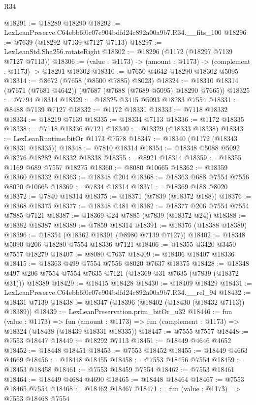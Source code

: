 \begin{lexlean}{R34}
\begin{coremodule}
@18291 := @18289 @18290
@18292 := LexLeanPreserve.C64ebb6f0c07e904bdfd24c892a00a9b7.R34.__fits_100
@18296 := @7639 (@18292 @7139 @7127 @7113)
@18297 := LexLeanStd.Sha256.rotateRight
@18302 := @18296 (@1172 (@18297 @7139 @7127 @7113))
@18306 := (value : @1173) -> (amount : @1173) -> (complement : @1173) -> @18291 @18302
@18310 := @7650 @4642 @18290 @18302 @5095
@18314 := @8672 (@7658 (@8500 @7885) @8023)
@18324 := @18310 @18314 (@7671 (@7681 @4642)) (@7687 (@7688 (@7689 @5095) @18290 @7665))
@18325 := @7794 @18314
@18329 := @18325 @3415 @5093 @18283 @7554
@18331 := @8488 @7139 @7127
@18332 := @1172 @18331
@18333 := @7118 @18332
@18334 := @18219 @7139
@18335 := @18334 @7113
@18336 := @1172 @18335
@18338 := @7118 @18336 @7121
@18340 := @18329 (@18333 @18338)
@18343 := LexLeanRuntime.bitOr @1173 @7578
@18347 := @18340 (@1172 (@18343 @18331 @18335))
@18348 := @7810 @18314
@18354 := @18348 @5088 @5092 @18276 @18282 @18332 @18338
@18355 := @8921 @18314
@18359 := @18355 @1169 @689 @7557 @18275
@18360 := @8080 @10665
@18362 := @18359 @18360 @18332
@18363 := @18348 @204
@18368 := @18363 @688 @7554 @7556 @8020 @10665
@18369 := @7834 @18314
@18371 := @18369 @188 @8020
@18372 := @7840 @18314
@18375 := @18371 (@7839 (@18372 @188))
@18376 := @18368 @18375
@18377 := @18348 @481
@18382 := @18377 @206 @7554 @7554 @7885 @7121
@18387 := @18369 @24 @7885 (@7839 (@18372 @24))
@18388 := @18382 @18387
@18389 := @7859 @18314
@18391 := @18376 (@18388 @18389)
@18396 := @18354 (@18362 @18391 (@8980 @7139 @7127))
@18402 := @18348 @5090 @206 @18280 @7554 @18336 @7121
@18406 := @18355 @3420 @3450 @7557 @18279
@18407 := @8080 @7637
@18409 := @18406 @18407 @18336
@18415 := @18363 @499 @7554 @7556 @8020 @7637 @18375
@18428 := @18348 @497 @206 @7554 @7554 @7635 @7121 (@18369 @31 @7635 (@7839 (@18372 @31))) @18389
@18429 := @18415 @18428
@18430 := @18409 @18429
@18431 := LexLeanPreserve.C64ebb6f0c07e904bdfd24c892a00a9b7.R34.__rel_94
@18432 := @18431 @7139
@18438 := @18347 (@18396 (@18402 (@18430 (@18432 @7113)) @18389))
@18439 := LexLeanPreservation.prim_bitOr_u32
@18446 := fun (value : @1173) =>
  fun (amount : @1173) => fun (complement : @1173) => @18324 (@18438 (@18439 @18331 @18335))
@18447 := @7555 @7557
@18448 := @7553 @18447
@18449 := @18292 @7113
@18451 := @18449 @4646 @4652
@18452 := @18448 @18451
@18453 := @7553 @18452
@18455 := @18449 @4663 @4669
@18456 := @18448 @18455
@18458 := @7553 @18456 @7554
@18459 := @18453 @18458
@18461 := @7553 @18459 @7554
@18462 := @7553 @18461
@18464 := @18449 @4684 @4690
@18465 := @18448 @18464
@18467 := @7553 @18465 @7554
@18468 := @18462 @18467
@18471 := fun (value : @1173) => @7553 @18468 @7554

\end{coremodule}
\end{lexlean}
